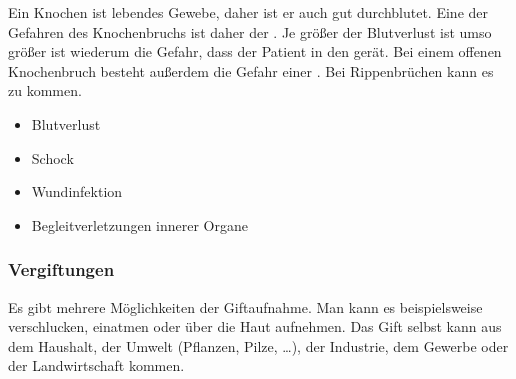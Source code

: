 {
Ein Knochen ist lebendes
Gewebe, daher ist er auch gut durchblutet. Eine der Gefahren
des Knochenbruchs ist daher der . Je größer
der Blutverlust ist umso größer ist wiederum die Gefahr,
dass der Patient in den  gerät. Bei einem offenen
Knochenbruch besteht außerdem die Gefahr einer
. Bei Rippenbrüchen kann
es zu  kommen.
\bigskip

\bigskip
}{
\begin{itemize}
    \item Blutverlust
    \item Schock
    \item Wundinfektion
    \item Begleitverletzungen innerer Organe
\end{itemize}
}{}{}{}


\protect{}
\protect{}


\subsubsection{Vergiftungen}
\label{topic:vergiftungen-ehi}

{
Es gibt mehrere Möglichkeiten der Giftaufnahme. Man kann es
beispielsweise verschlucken, einatmen oder über die Haut
aufnehmen. Das Gift selbst kann aus dem Haushalt, der Umwelt
(Pflanzen, Pilze, \ldots), der Industrie, dem Gewerbe oder
der Landwirtschaft kommen.

}{
}{}{}{}

